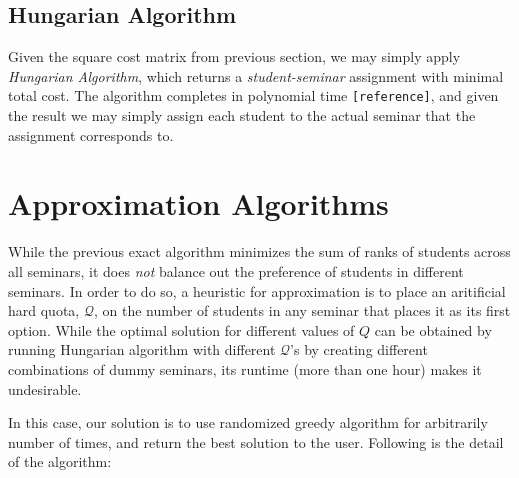 \documentclass{article} %
\begin{document}
\subsection{Hungarian Algorithm}
    \par\qquad Given the square cost matrix from previous section, we may simply apply \emph{Hungarian Algorithm}, which returns a \emph{student-seminar} assignment with minimal total cost. The algorithm completes in polynomial time \texttt{[reference]}, and given the result we may simply assign each student to the actual seminar that the assignment corresponds to.

%
%
\section{Approximation Algorithms}
    \par\qquad While the previous exact algorithm minimizes the sum of ranks of students across all seminars, it does \emph{not} balance out the preference of students in different seminars. In order to do so, a heuristic for approximation is to place an aritificial hard quota, $\mathcal{Q}$, on the number of students in any seminar that places it as its first option. While the optimal solution for different values of $Q$ can be obtained by running Hungarian algorithm with different $\mathcal{Q}$'s by creating different combinations of dummy seminars, its runtime (more than one hour) makes it undesirable.
    \par\qquad In this case, our solution is to use randomized greedy algorithm for arbitrarily number of times, and return the best solution to the user. Following is the detail of the algorithm:
\end{document}
